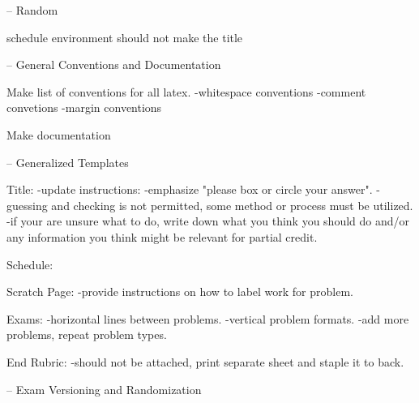 
-- Random

schedule environment should not make the title


-- General Conventions and Documentation

Make list of conventions for all latex.
	-whitespace conventions
	-comment convetions
	-margin conventions

Make documentation


-- Generalized Templates

Title:
	-update instructions:
		-emphasize "please box or circle your answer".
		-guessing and checking is not permitted, some method or process must be utilized.
		-if your are unsure what to do, write down what you think you should do and/or any information you think might be relevant for partial credit.

Schedule:


Scratch Page:
	-provide instructions on how to label work for problem.

Exams:
	-horizontal lines between problems.
	-vertical problem formats.
	-add more problems, repeat problem types.

	End Rubric:
		-should not be attached, print separate sheet and staple it to back.


-- Exam Versioning and Randomization


